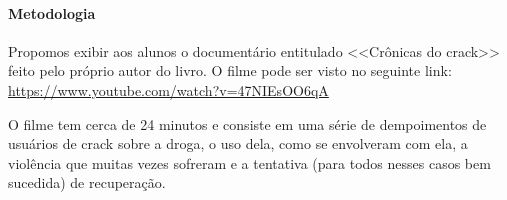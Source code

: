 \documentclass[11pt]{extarticle}
\begin{document}
\paragraph{Metodologia}
	
		Propomos exibir aos alunos o documentário
		entitulado <<Crônicas do crack>> feito pelo próprio
		autor do livro. O filme pode ser visto no seguinte link:
		\url{https://www.youtube.com/watch?v=47NIEsOO6qA}

		O filme tem cerca de 24 minutos e consiste em uma série de dempoimentos
		de usuários de crack sobre
		a droga, o uso dela, como se envolveram com ela, 
		a violência que muitas vezes sofreram e a
		tentativa (para todos nesses casos bem sucedida) de recuperação.
\end{document}
